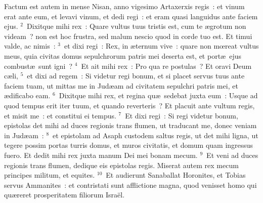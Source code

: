 \lettrine[lines=10,image=true,loversize=0.05,lraise=-0.03]{F}{}actum est autem in mense Nisan, anno vigesimo Artaxerxis regis~: et vinum erat ante eum, et levavi vinum, et dedi regi~: et eram quasi languidus ante faciem ejus.
${}^{2}$~Dixitque mihi rex~: Quare vultus tuus tristis est, cum te \ae grotum non videam~? non est hoc frustra, sed malum nescio quod in corde tuo est. Et timui valde, ac nimis~:
${}^{3}$~et dixi regi~: Rex, in \ae ternum vive~: quare non mœreat vultus meus, quia civitas domus sepulchrorum patris mei deserta est, et port\ae\ ejus combust\ae\ sunt igni~?
${}^{4}$~Et ait mihi rex~: Pro qua re postulas~? Et oravi Deum c\ae li,
${}^{5}$~et dixi ad regem~: Si videtur regi bonum, et si placet servus tuus ante faciem tuam, ut mittas me in Jud\ae am ad civitatem sepulchri patris mei, et \ae dificabo eam.
${}^{6}$~Dixitque mihi rex, et regina qu\ae\ sedebat juxta eum~: Usque ad quod tempus erit iter tuum, et quando reverteris~? Et placuit ante vultum regis, et misit me~: et constitui ei tempus.
${}^{7}$~Et dixi regi~: Si regi videtur bonum, epistolas det mihi ad duces regionis trans flumen, ut traducant me, donec veniam in Jud\ae am~:
${}^{8}$~et epistolam ad Asaph custodem saltus regis, ut det mihi ligna, ut tegere possim portas turris domus, et muros civitatis, et domum quam ingressus fuero. Et dedit mihi rex juxta manum Dei mei bonam mecum.
${}^{9}$~Et veni ad duces regionis trans flumen, dedique eis epistolas regis. Miserat autem rex mecum principes militum, et equites.
${}^{10}$~Et audierunt Sanaballat Horonites, et Tobias servus Ammanites~: et contristati sunt afflictione magna, quod venisset homo qui qu\ae reret prosperitatem filiorum Isra\"el.


